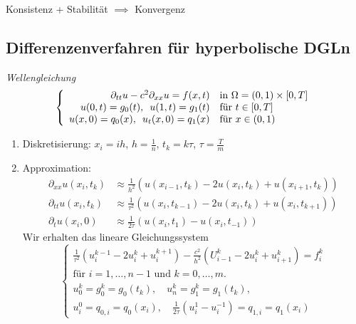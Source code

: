 \documentclass{cheat-sheet}
\begin{document}
\begin{bem}
  Konsistenz + Stabilität $\implies$ Konvergenz
\end{bem}
\fi

\begin{samepage}

\subsection{Differenzenverfahren für hyperbolische DGLn}

\begin{prob}
  \emph{Wellengleichung}
  \[
    \left\{ \begin{array}{rl}
      \partial_{tt} u - c^2 \partial_{xx} u = f(x,t) & \text{in $\Omega = \left( 0, 1 \right) \times \left[ 0, T \right]$} \\
      u(0, t) = g_0(t), \enspace u(1, t) = g_1(t) & \text{für $t \in \left[ 0, T \right]$} \\
      u(x, 0) = q_0(x), \enspace u_t(x, 0) = q_1(x) & \text{für $x \in \left( 0, 1 \right)$}
    \end{array} \right.
  \]
\end{prob}

\begin{verf}
  \begin{enumerate}
    \item Diskretisierung: $x_i = ih$, $h = \tfrac{1}{n}$, $t_k = k \tau$, $\tau = \tfrac{T}{m}$
    \item Approximation:
    \begin{align*}
      \partial_{xx} u(x_i, t_k) & \approx \tfrac{1}{h^2} \left( u(x_{i-1}, t_k) - 2 u(x_i, t_k) + u(x_{i+1}, t_k) \right) \\
      \partial_{tt} u(x_i, t_k) & \approx \tfrac{1}{\tau^2} \left( u(x_i, t_{k-1}) - 2 u(x_i, t_k) + u(x_i, t_{k+1}) \right) \\
      \partial_t u(x_i, 0) & \approx \tfrac{1}{2 \tau} ( u(x_i, t_1) - u(x_i, t_{-1}) )
    \end{align*}
    Wir erhalten das lineare Gleichungssystem
    \[
      \left\{ \begin{array}{r}
        \tfrac{1}{\tau^2} (u_i^{k-1} - 2 u_i^k + u_i^{k+1}) - \tfrac{c^2}{h^2} ( U_{i-1}^k - 2 u_i^k + u_{i+1}^k) = f_i^k \\
        \text{für $i = 1, \ldots, n-1$ und $k = 0, \ldots, m$.} \\
        u_0^k = g_0^k = g_0(t_k), \quad
        u_n^k = g_1^k = g_1(t_k), \\
        u_i^0 = q_{0,i} = q_0(x_i), \quad
        \tfrac{1}{2 \tau} ( u_i^1 - u_i^{-1} ) = q_{1,i} = q_1(x_i)
      \end{array} \right.
    \]
  \end{enumerate}
\end{verf}

\end{samepage}
\end{document}
